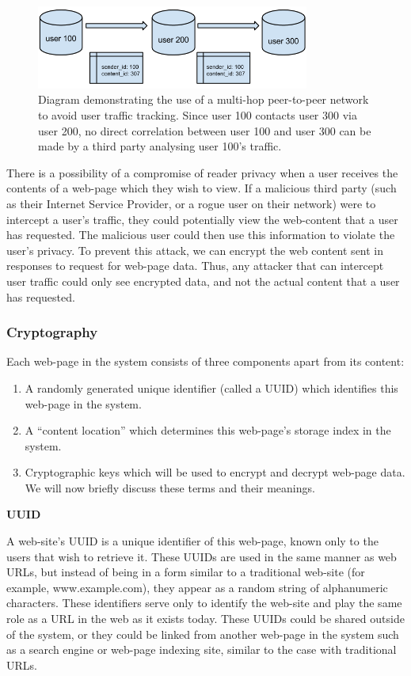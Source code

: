 \begin{figure}[H]
    \centering
    \includegraphics[width=0.8\textwidth]{img/indirection.png}
    \caption{Diagram demonstrating the use of a multi-hop peer-to-peer network to avoid user traffic tracking.
    Since user 100 contacts user 300 via user 200, no direct correlation between user 100 and user 300 can be made
by a third party analysing user 100's traffic.}
    \label{fig:multi-hop}
\end{figure}

There is a possibility of a compromise of reader privacy when a user receives the contents of a web-page which
they wish to view. If a malicious third party (such as their Internet Service Provider, or a rogue user on their
network) were to intercept a user's traffic, they could potentially view the web-content that a user has requested.
The malicious user could then use this information to violate the user's privacy.
To prevent this attack, we can encrypt the web content sent in responses to request for web-page data. Thus, any
attacker that can intercept user traffic could only see encrypted data, and not the actual content that a user has
requested.

\subsubsection{Cryptography}

Each web-page in the system consists of three components apart from its content:
\begin{enumerate}
    \item A randomly generated unique identifier (called a UUID) which identifies this web-page in the system.
    \item A ``content location'' which determines this web-page's storage index in the system.
    \item Cryptographic keys which will be used to encrypt and decrypt web-page data.
We will now briefly discuss these terms and their meanings.
\end{enumerate}

\textbf{UUID}

A web-site's UUID is a unique identifier of this web-page, known only to the users that wish to retrieve it.
These UUIDs are used in the same manner as web URLs, but instead of being in a form similar to a traditional web-site
(for example, www.example.com), they appear as a random string of alphanumeric characters. These identifiers serve
only to identify the web-site and play the same role as a URL in the web as it exists today. These UUIDs could be
shared outside of the system, or they could be linked from another web-page in the system such as a search engine or
web-page indexing site, similar to the case with traditional URLs.

